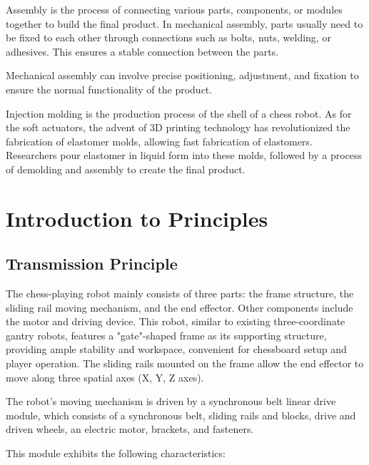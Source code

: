 \documentclass[10pt, a4paper, twocolumn]{article}
\begin{document}
Assembly is the process of connecting various parts, components, or modules together to build the final product. In mechanical assembly, parts usually need to be fixed to each other through connections such as bolts, nuts, welding, or adhesives. This ensures a stable connection between the parts.

Mechanical assembly can involve precise positioning, adjustment, and fixation to ensure the normal functionality of the product.

Injection molding is the production process of the shell of a chess robot. As for the soft actuators, the advent of 3D printing technology has revolutionized the fabrication of elastomer molds\cite{Terryn2017}, allowing fast fabrication of elastomers. Researchers pour elastomer in liquid form into these molds, followed by a process of demolding and assembly to create the final product.

\section{Introduction to Principles}
\subsection{Transmission Principle}
The chess-playing robot mainly consists of three parts: the frame structure, the sliding rail moving mechanism, and the end effector. Other components include the motor and driving device. This robot, similar to existing three-coordinate gantry robots, features a "gate"-shaped frame as its supporting structure, providing ample stability and workspace, convenient for chessboard setup and player operation. The sliding rails mounted on the frame allow the end effector to move along three spatial axes (X, Y, Z axes).

The robot's moving mechanism is driven by a synchronous belt linear drive module, which consists of a synchronous belt, sliding rails and blocks, drive and driven wheels, an electric motor, brackets, and fasteners. 

This module exhibits the following characteristics:
\end{document}
